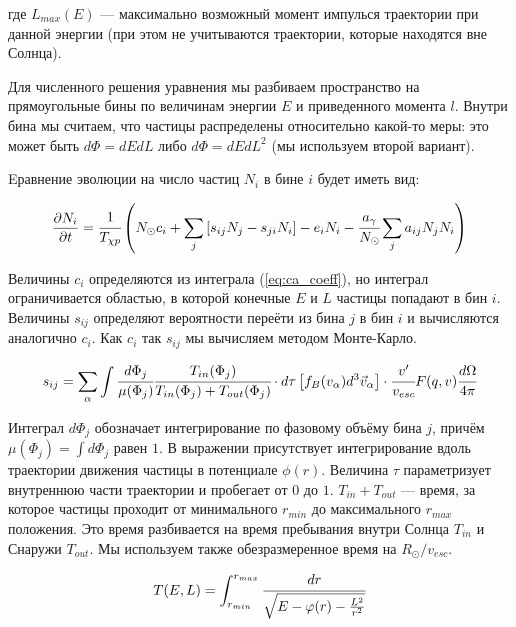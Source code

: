 где $L_{max}(E)$ --- максимально возможный момент импулься траектории при данной энергии (при этом не учитываются траектории, которые находятся вне Солнца).



Для численного решения уравнения мы разбиваем пространство на прямоугольные бины по величинам энергии $E$ и приведенного момента $l$. Внутри бина мы считаем, что частицы распределены относительно какой-то меры: это может быть $d\Phi = dEdL$ либо $d\Phi = dEdL^2$ (мы используем второй вариант). 

Eравнение эволюции на число частиц $N_{i}$ в бине $i$ будет иметь вид:

\begin{equation}
	\label{eq:evolution}
	\frac{\partial N_{i}}{\partial t} = \cfrac{1}{T_{\chi p}} \left(N_{\odot} c_i +
	\sum_j{[s_{ij} N_{j} - s_{ji} N_{i} ]} - e_{i} N_i - \cfrac{a_{\gamma}}{N_{\odot}} \sum_j {a_{ij} N_j N_i} \right)
\end{equation}

Величины $c_i$ определяются из интеграла (\ref{eq:ca_coeff}), но интеграл ограничивается областью, в которой конечные $E$ и $L$ частицы попадают в бин $i$.
Величины $s_{ij}$ определяют вероятности переёти из бина $j$ в бин $i$ и вычисляются аналогично $c_{i}$. Как $c_{i}$ так  $s_{ij}$ мы вычисляем методом Монте-Карло.

\begin{equation}
	\label{eq:st_integral}
	s_{ij} = \sum_{\alpha}\int{
		\cfrac{d\Phi_{j}}{\mu(\Phi_{j})}
		\cfrac{T_{in}(\Phi_{j})}{
			T_{in}(\Phi_{j})+T_{out}(\Phi_{j})
		} \cdot d\tau \left[ f_B(v_{\alpha}) d^3 \vec{v}_{\alpha} \right] \cdot \cfrac{v'}{v_{esc}} F(q,v) \cfrac{d\Omega}{4\pi}
	}
\end{equation}

\noindent Интеграл $d\Phi_{j}$ обозначает интегрирование по фазовому объёму бина $j$, причём $\mu(\Phi_{j}) = \int{d\Phi_{j}}$ равен $1$. В выражении присутствует интегрирование вдоль траектории движения частицы в потенциале $\phi(r)$. Величина $\tau$ параметризует внутреннюю части траектории и пробегает от $0$ до $1$. $T_{in} + T_{out}$ --- время, за которое частицы проходит от минимального $r_{min}$ до максимального $r_{max}$ положения. Это время разбивается на время пребывания внутри Солнца $T_{in}$ и Снаружи $T_{out}$. Мы используем также обезразмеренное время на $R_{\odot}/v_{esc}$.

\begin{equation*}
	T(E,L) = \int_{r_{min}}^{r_{max}}{\cfrac{dr}{
			\sqrt{E - \varphi(r) - \frac{L^2}{r^2}}
		} 
	}
\end{equation*}

